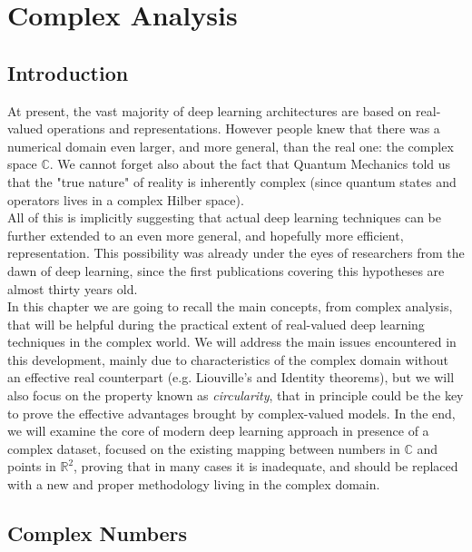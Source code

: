 \documentclass[../main.tex]{subfiles}
\begin{document}
\chapter{Complex Analysis}
\label{ch:cmplx_analysis}

\section*{Introduction}

At present, the vast majority of deep learning architectures are based on real-valued operations and representations. However people knew that there was a numerical domain even larger, and more general, than the real one: the complex space $\mathds{C}$. We cannot forget also about the fact that Quantum Mechanics told us that the "true nature" of reality is inherently complex (since quantum states and operators lives in a complex Hilber space).\\ 
All of this is implicitly suggesting that actual deep learning techniques can be further extended to an even more general, and hopefully more efficient, representation. This possibility was already under the eyes of researchers from the dawn of deep learning, since the first publications covering this hypotheses are almost thirty years old.\\
In this chapter we are going to recall the main concepts, from complex analysis, that will be helpful during the practical extent of real-valued deep learning techniques in the complex world. We will address the main issues encountered in this development, mainly due to characteristics of the complex domain without an effective real counterpart (e.g. Liouville's and Identity theorems), but we will also focus on the property known as \textit{circularity}, that in principle could be the key to prove the effective advantages brought by complex-valued models. In the end, we will examine the core of modern deep learning approach in presence of a complex dataset, focused on the existing mapping between numbers in $\mathds{C}$ and points in $\mathds{R}^2$, proving that in many cases it is inadequate, and should be replaced with a new and proper methodology living in the complex domain.

\section{Complex Numbers}
\label{sec:cmplx_numbers}
\end{document}
